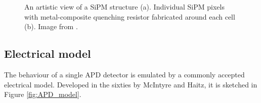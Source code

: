 \begin{figure}
	\centering
	 \quad
	\caption{An artistic view of a SiPM structure (a). Individual  SiPM  pixels  with  metal-composite  quenching  resistor  fabricated around each cell (b). Image from \cite{SiPM_img_APD}.}
	\label{fig:SiPM_APD}
\end{figure}

\subsection*{Electrical model}
The behaviour of a single APD detector is emulated by a commonly accepted electrical model. Developed in the sixties by McIntyre and Haitz, it is sketched in Figure \ref{fig:APD_model}.\\

